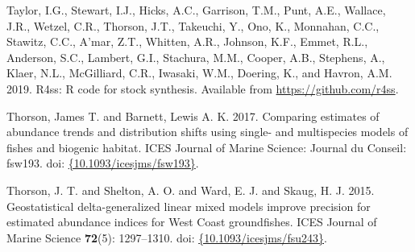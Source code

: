 \documentclass[12pt,]{article}
\begin{document}
\leavevmode\hypertarget{ref-Taylor2019}{}%
Taylor, I.G., Stewart, I.J., Hicks, A.C., Garrison, T.M., Punt, A.E.,
Wallace, J.R., Wetzel, C.R., Thorson, J.T., Takeuchi, Y., Ono, K.,
Monnahan, C.C., Stawitz, C.C., A'mar, Z.T., Whitten, A.R., Johnson,
K.F., Emmet, R.L., Anderson, S.C., Lambert, G.I., Stachura, M.M.,
Cooper, A.B., Stephens, A., Klaer, N.L., McGilliard, C.R., Iwasaki,
W.M., Doering, K., and Havron, A.M. 2019. R4ss: R code for stock
synthesis. Available from \url{https://github.com/r4ss}.

\leavevmode\hypertarget{ref-Thorson2017a}{}%
Thorson, James T. and Barnett, Lewis A. K. 2017. Comparing estimates of
abundance trends and distribution shifts using single- and multispecies
models of fishes and biogenic habitat. ICES Journal of Marine Science:
Journal du Conseil: fsw193. doi:
\href{https://doi.org/\%7B10.1093/icesjms/fsw193\%7D}{\{10.1093/icesjms/fsw193\}}.

\leavevmode\hypertarget{ref-Thorson2015}{}%
Thorson, J. T. and Shelton, A. O. and Ward, E. J. and Skaug, H. J. 2015.
Geostatistical delta-generalized linear mixed models improve precision
for estimated abundance indices for West Coast groundfishes. ICES
Journal of Marine Science \textbf{72}(5): 1297--1310. doi:
\href{https://doi.org/\%7B10.1093/icesjms/fsu243\%7D}{\{10.1093/icesjms/fsu243\}}.
\end{document}
